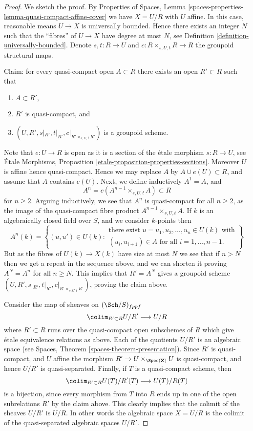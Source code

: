 \begin{proof}
We sketch the proof. By
Properties of Spaces, Lemma
\ref{spaces-properties-lemma-quasi-compact-affine-cover}
we have $X = U/R$ with $U$ affine.
In this case, reasonable means $U \to X$ is universally bounded.
Hence there exists an integer $N$ such that the ``fibres'' of $U \to X$
have degree at most $N$, see
Definition \ref{definition-universally-bounded}.
Denote $s, t : R \to U$ and $c : R \times_{s, U, t} R \to R$ the
groupoid structural maps.

\medskip\noindent
Claim: for every quasi-compact open $A \subset R$ there exists
an open $R' \subset R$ such that
\begin{enumerate}
\item $A \subset R'$,
\item $R'$ is quasi-compact, and
\item $(U, R', s|_{R'}, t|_{R'}, c|_{R' \times_{s, U, t} R'})$ is
a groupoid scheme.
\end{enumerate}
Note that $e : U \to R$ is open as it is a section of the \'etale morphism
$s : R \to U$, see
\'Etale Morphisms, Proposition \ref{etale-proposition-properties-sections}.
Moreover $U$ is affine hence quasi-compact. Hence we may replace $A$ by
$A \cup e(U) \subset R$, and assume that $A$ contains $e(U)$. Next, we
define inductively $A^1 = A$, and
$$
A^n = c(A^{n - 1} \times_{s, U, t} A) \subset R
$$
for $n \geq 2$. Arguing inductively, we see that $A^n$ is quasi-compact for
all $n \geq 2$, as the image of the quasi-compact fibre product
$A^{n - 1} \times_{s, U, t} A$. If $k$ is an algebraically
closed field over $S$, and we consider $k$-points then
$$
A^n(k) = \left\{(u, u') \in U(k)
:
\begin{matrix}
\text{there exist } u = u_1, u_2, \ldots, u_n \in U(k)\text{ with} \\
(u_i , u_{i + 1}) \in A \text{ for all }i = 1, \ldots, n - 1.
\end{matrix}
\right\}
$$
But as the fibres of $U(k) \to X(k)$ have size at most $N$ we see that if
$n > N$ then we get a repeat in the sequence above, and we can shorten it
proving $A^N = A^n$ for all $n \geq N$.
This implies that $R' = A^N$ gives a groupoid scheme
$(U, R', s|_{R'}, t|_{R'}, c|_{R' \times_{s, U, t} R'})$, proving the claim
above.

\medskip\noindent
Consider the map of sheaves on $(\Sch/S)_{fppf}$
$$
\colim_{R' \subset R} U/R' \longrightarrow U/R
$$
where $R' \subset R$ runs over the quasi-compact open subschemes
of $R$ which give \'etale equivalence relations as above. Each of the
quotients $U/R'$ is an algebraic space
(see Spaces, Theorem \ref{spaces-theorem-presentation}).
Since $R'$ is quasi-compact, and $U$ affine the morphism
$R' \to U \times_{\Spec(\mathbf{Z})} U$ is quasi-compact,
and hence $U/R'$ is quasi-separated. Finally, if $T$ is a quasi-compact
scheme, then
$$
\colim_{R' \subset R} U(T)/R'(T) \longrightarrow U(T)/R(T)
$$
is a bijection, since every morphism from $T$ into $R$ ends up in one
of the open subrelations $R'$ by the claim above. This clearly implies
that the colimit of the sheaves $U/R'$ is $U/R$. In other words
the algebraic space $X = U/R$ is the colimit of the quasi-separated
algebraic spaces $U/R'$.


\end{proof}
